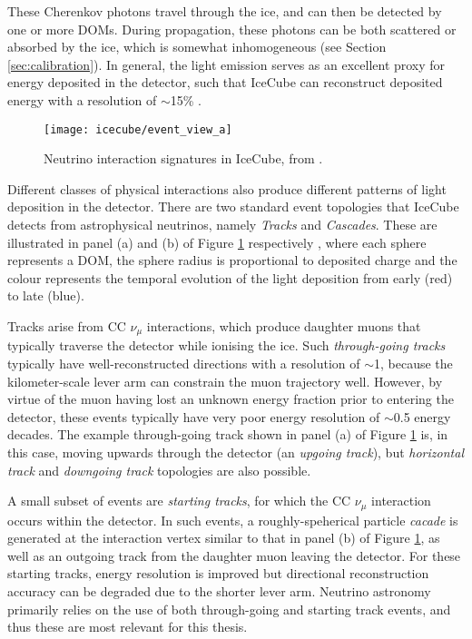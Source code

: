 These Cherenkov photons travel through the ice, and can then be detected by one or more DOMs. During propagation, these photons can be both scattered or absorbed by the ice, which is somewhat inhomogeneous (see Section \ref{sec:calibration}). In general, the light emission serves as an excellent proxy for energy deposited in the detector, such that IceCube can reconstruct deposited energy with a resolution of $\sim$15\% . 

\begin{figure}
	\centering \texttt{[image: icecube/event\_view\_a]}
	\caption{Neutrino interaction signatures in IceCube, from \cite{kintscher_thesis}.}
	\label{fig:event_views}
\end{figure}

Different classes of physical interactions also produce different patterns of light deposition in the detector. There are two standard event topologies that IceCube detects from astrophysical neutrinos, namely \emph{Tracks} and \emph{Cascades}. These are illustrated in panel (a) and (b) of Figure \ref{fig:event_views} respectively , where each sphere represents a DOM, the sphere radius is proportional to deposited charge and the colour represents the temporal evolution of the light deposition from early (red) to late (blue). 

Tracks arise from CC $\nu_{\mu}$ interactions, which produce daughter muons that typically traverse the detector while ionising the ice. Such \emph{through-going tracks} typically have well-reconstructed directions with a resolution of $\sim$1\arcdeg, because the kilometer-scale lever arm can constrain the muon trajectory well. However, by virtue of the muon having lost an unknown energy fraction prior to entering the detector, these events typically have very poor energy resolution of $\sim$0.5 energy decades. The example through-going track shown in panel (a) of Figure \ref{fig:event_views} is, in this case, moving upwards through the detector (an \emph{upgoing track}), but \emph{horizontal track} and \emph{downgoing track} topologies are also possible. 

A small subset of events are \emph{starting tracks}, for which the CC $\nu_{\mu}$ interaction occurs within the detector. In such events, a roughly-speherical particle \emph{cacade} is generated at the interaction vertex similar to that in panel (b) of Figure \ref{fig:event_views}, as well as an outgoing track from the daughter muon leaving the detector. For these starting tracks, energy resolution is improved but directional reconstruction accuracy can be degraded due to the shorter lever arm. Neutrino astronomy primarily relies on the use of both through-going and starting track events, and thus these are most relevant for this thesis. 

